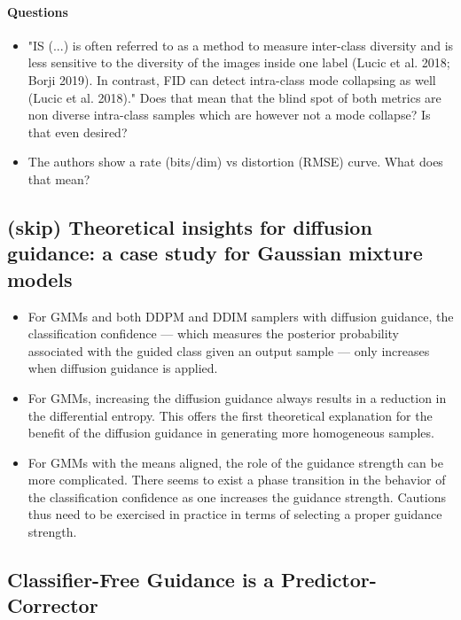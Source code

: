 \documentclass{article}
\begin{document}
\paragraph{Questions}
\begin{itemize}
    \item "IS (...) is often referred to as a method to measure inter-class diversity and is less sensitive to the diversity of the images inside one label (Lucic et al. 2018; Borji 2019). In contrast, FID can detect intra-class mode collapsing as well (Lucic et al. 2018)."
    Does that mean that the blind spot of both metrics are non diverse intra-class samples which are however not a mode collapse? Is that even desired?
    \item The authors show a rate (bits/dim) vs distortion (RMSE) curve. What does that mean?
\end{itemize}

\subsection{(skip) Theoretical insights for diffusion guidance: a case study for Gaussian mixture models}
\begin{itemize}
    \item For GMMs and both DDPM and DDIM samplers with diffusion guidance, the classification confidence — which measures the posterior probability associated with the guided class given an output sample — only increases when diffusion guidance is applied. 
    \item For GMMs, increasing the diffusion guidance always results in a reduction in the differential entropy. This offers the first theoretical explanation for the benefit of the diffusion guidance in generating more homogeneous samples. 
    \item For GMMs with the means aligned, the role of the guidance strength can be more complicated. There seems to exist a phase transition in the behavior of the classification confidence as one increases the guidance strength. Cautions thus need to be exercised in practice in terms of selecting a proper guidance strength.
\end{itemize}

\subsection{\color{ForestGreen} Classifier-Free Guidance is a Predictor-Corrector}
\end{document}
